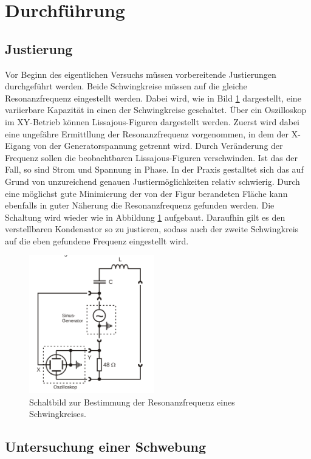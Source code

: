 \section{Durchführung}
\label{sec:Durchführung}

\subsection{Justierung} 
\label{sub:Justierung}


Vor Beginn des eigentlichen Versuchs müssen vorbereitende Justierungen durchgeführt werden. Beide Schwingkreise müssen 
auf die gleiche Resonanzfrequenz eingestellt werden.
Dabei wird, wie in Bild \ref{fig:bild5} dargestellt, eine variierbare Kapazität in einen der Schwingkreise geschaltet. Über ein
Oszilloskop im XY-Betrieb können Lissajous-Figuren dargestellt werden. Zuerst wird dabei eine ungefähre Ermittllung der Resonanzfrequenz vorgenommen, in dem der X-Eigang von der 
Generatorspannung getrennt wird. Durch Veränderung der Frequenz sollen die beobachtbaren Lissajous-Figuren verschwinden. Ist das der Fall, so sind Strom und Spannung in Phase. In der Praxis gestalltet sich das auf Grund von unzureichend genauen Justiermöglichkeiten relativ schwierig.
Durch eine möglichst gute Minimierung der von der Figur berandeten Fläche kann
ebenfalls in guter Näherung die Resonanzfrequenz gefunden werden. Die Schaltung wird wieder wie in Abbildung \ref{fig:bild5} aufgebaut. Daraufhin gilt es den verstellbaren Kondensator so zu justieren, sodass auch der zweite Schwingkreis auf die eben gefundene Frequenz eingestellt wird.


\begin{figure}
\label{fig:bild5}
    \centering
    \includegraphics[height=6.0cm]{data/Bild5.png}
    \caption{Schaltbild zur Bestimmung der Resonanzfrequenz eines Schwingkreises.}
\end{figure}

\subsection{Untersuchung einer Schwebung} 
\label{sub:Untersuchung einer Schwebung}




